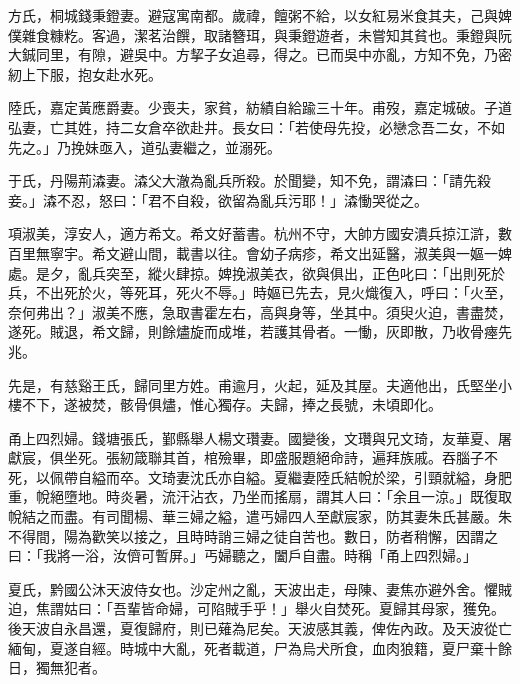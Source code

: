 \begin{pinyinscope}
方氏，桐城錢秉鐙妻。避寇寓南都。歲禕，饘粥不給，以女紅易米食其夫，己與婢僕雜食糠籺。客過，潔茗治饌，取諸簪珥，與秉鐙遊者，未嘗知其貧也。秉鐙與阮大鋮同里，有隙，避吳中。方挈子女追尋，得之。已而吳中亦亂，方知不免，乃密紉上下服，抱女赴水死。

陸氏，嘉定黃應爵妻。少喪夫，家貧，紡績自給踰三十年。甫歿，嘉定城破。子道弘妻，亡其姓，持二女倉卒欲赴井。長女曰：「若使母先投，必戀念吾二女，不如先之。」乃挽妹亟入，道弘妻繼之，並溺死。

于氏，丹陽荊潹妻。潹父大澈為亂兵所殺。於聞變，知不免，謂潹曰：「請先殺妾。」潹不忍，怒曰：「君不自殺，欲留為亂兵污耶！」潹慟哭從之。

項淑美，淳安人，適方希文。希文好蓄書。杭州不守，大帥方國安潰兵掠江滸，數百里無寧宇。希文避山間，載書以往。會幼子病疹，希文出延醫，淑美與一嫗一婢處。是夕，亂兵突至，縱火肆掠。婢挽淑美衣，欲與俱出，正色叱曰：「出則死於兵，不出死於火，等死耳，死火不辱。」時嫗已先去，見火熾復入，呼曰：「火至，奈何弗出？」淑美不應，急取書霍左右，高與身等，坐其中。須臾火迫，書盡焚，遂死。賊退，希文歸，則餘燼旋而成堆，若護其骨者。一慟，灰即散，乃收骨瘞先兆。

先是，有慈谿王氏，歸同里方姓。甫逾月，火起，延及其屋。夫適他出，氏堅坐小樓不下，遂被焚，骸骨俱燼，惟心獨存。夫歸，捧之長號，未頃即化。

甬上四烈婦。錢塘張氏，鄞縣舉人楊文瓚妻。國變後，文瓚與兄文琦，友華夏、屠獻宸，俱坐死。張紉箴聯其首，棺殮畢，即盛服題絕命詩，遍拜族戚。吞腦子不死，以佩帶自縊而卒。文琦妻沈氏亦自縊。夏繼妻陸氏結帨於梁，引頸就縊，身肥重，帨絕墮地。時炎暑，流汗沾衣，乃坐而搖扇，謂其人曰：「余且一涼。」既復取帨結之而盡。有司聞楊、華三婦之縊，遣丐婦四人至獻宸家，防其妻朱氏甚嚴。朱不得間，陽為歡笑以接之，且時時誚三婦之徒自苦也。數日，防者稍懈，因謂之曰：「我將一浴，汝儕可暫屏。」丐婦聽之，闔戶自盡。時稱「甬上四烈婦。」

夏氏，黔國公沐天波侍女也。沙定州之亂，天波出走，母陳、妻焦亦避外舍。懼賊迫，焦謂姑曰：「吾輩皆命婦，可陷賊手乎！」舉火自焚死。夏歸其母家，獲免。後天波自永昌還，夏復歸府，則已薙為尼矣。天波感其義，俾佐內政。及天波從亡緬甸，夏遂自經。時城中大亂，死者載道，尸為烏犬所食，血肉狼籍，夏尸棄十餘日，獨無犯者。


\end{pinyinscope}